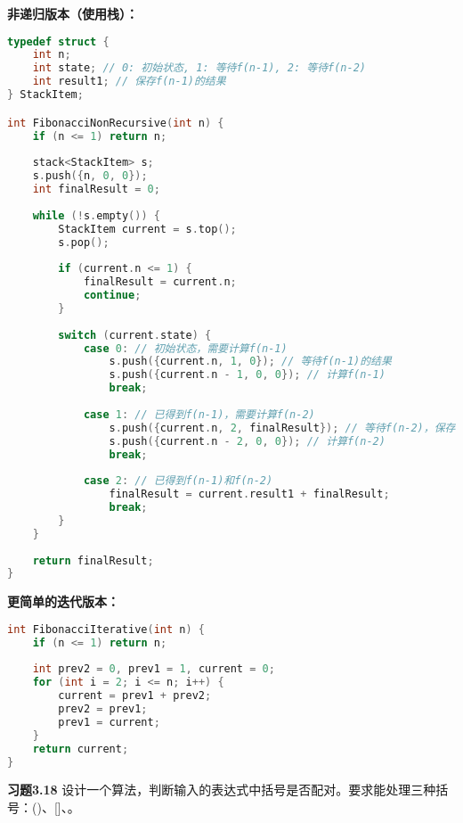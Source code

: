 \documentclass[12pt,a4paper]{amsart}
\begin{document}
\textbf{非递归版本（使用栈）：}
\begin{lstlisting}[language=C++]
typedef struct {
    int n;
    int state; // 0: 初始状态, 1: 等待f(n-1), 2: 等待f(n-2)
    int result1; // 保存f(n-1)的结果
} StackItem;

int FibonacciNonRecursive(int n) {
    if (n <= 1) return n;
    
    stack<StackItem> s;
    s.push({n, 0, 0});
    int finalResult = 0;
    
    while (!s.empty()) {
        StackItem current = s.top();
        s.pop();
        
        if (current.n <= 1) {
            finalResult = current.n;
            continue;
        }
        
        switch (current.state) {
            case 0: // 初始状态，需要计算f(n-1)
                s.push({current.n, 1, 0}); // 等待f(n-1)的结果
                s.push({current.n - 1, 0, 0}); // 计算f(n-1)
                break;
                
            case 1: // 已得到f(n-1)，需要计算f(n-2)
                s.push({current.n, 2, finalResult}); // 等待f(n-2)，保存f(n-1)
                s.push({current.n - 2, 0, 0}); // 计算f(n-2)
                break;
                
            case 2: // 已得到f(n-1)和f(n-2)
                finalResult = current.result1 + finalResult;
                break;
        }
    }
    
    return finalResult;
}
\end{lstlisting}

\textbf{更简单的迭代版本：}
\begin{lstlisting}[language=C++]
int FibonacciIterative(int n) {
    if (n <= 1) return n;
    
    int prev2 = 0, prev1 = 1, current = 0;
    for (int i = 2; i <= n; i++) {
        current = prev1 + prev2;
        prev2 = prev1;
        prev1 = current;
    }
    return current;
}
\end{lstlisting}

\textbf{习题3.18} 设计一个算法，判断输入的表达式中括号是否配对。要求能处理三种括号：()、[]、{}。
\end{document}
